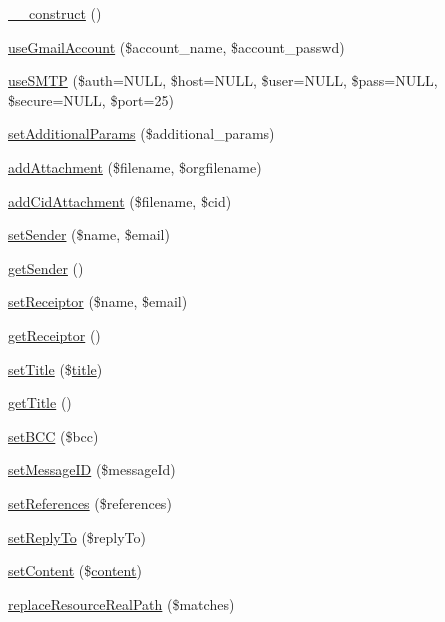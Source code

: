 \begin{DoxyCompactItemize}
\item 
\hyperlink{classMail_aeed5d07076a358f294f84769915d5029}{\-\_\-\-\_\-construct} ()
\item 
\hyperlink{classMail_aa6094205d902ff01c7b0828f0e5e3221}{use\-Gmail\-Account} (\$account\-\_\-name, \$account\-\_\-passwd)
\item 
\hyperlink{classMail_a73ddc444b256378acb00373e9ac3171e}{use\-S\-M\-T\-P} (\$auth=N\-U\-L\-L, \$host=N\-U\-L\-L, \$user=N\-U\-L\-L, \$pass=N\-U\-L\-L, \$secure=N\-U\-L\-L, \$port=25)
\item 
\hyperlink{classMail_abea35dd9f29bbebacfc79ec2c7852799}{set\-Additional\-Params} (\$additional\-\_\-params)
\item 
\hyperlink{classMail_a318b203a297cfd20179ffe85a6fd7394}{add\-Attachment} (\$filename, \$orgfilename)
\item 
\hyperlink{classMail_ac926ab20cda232c4656a64eaf02a4ab4}{add\-Cid\-Attachment} (\$filename, \$cid)
\item 
\hyperlink{classMail_a13ed057003fa15b778da2a30ee7cb59f}{set\-Sender} (\$name, \$email)
\item 
\hyperlink{classMail_a25c8d959a398cdfe3919d9fd634358d7}{get\-Sender} ()
\item 
\hyperlink{classMail_aa1ffe38b98a8d9eb618133c3dff48f90}{set\-Receiptor} (\$name, \$email)
\item 
\hyperlink{classMail_ae334a42923b5cd5d4c7012ba944c3841}{get\-Receiptor} ()
\item 
\hyperlink{classMail_a1762e37387d9875d12977a5395bca29d}{set\-Title} (\$\hyperlink{ko_8install_8php_a5b072c5fd1d2228c6ba5cee13cd142e3}{title})
\item 
\hyperlink{classMail_aa03664254d34901e8545fa3725224e92}{get\-Title} ()
\item 
\hyperlink{classMail_a13267ee2cbaef851020cb3bf833437e8}{set\-B\-C\-C} (\$bcc)
\item 
\hyperlink{classMail_a51becbf02e5e415277fa8f4049ece136}{set\-Message\-I\-D} (\$message\-Id)
\item 
\hyperlink{classMail_a82b9ee0a8e238eef4028d135936374c9}{set\-References} (\$references)
\item 
\hyperlink{classMail_a8c2b05357bfaf3cb8dc165fbd5c9d8e2}{set\-Reply\-To} (\$reply\-To)
\item 
\hyperlink{classMail_a2112ae431d2a140d8624b943cf0eace9}{set\-Content} (\$\hyperlink{classcontent}{content})
\item 
\hyperlink{classMail_ae3182bb75fb675d2baceaf2c38dc7edd}{replace\-Resource\-Real\-Path} (\$matches)

\end{DoxyCompactItemize}

